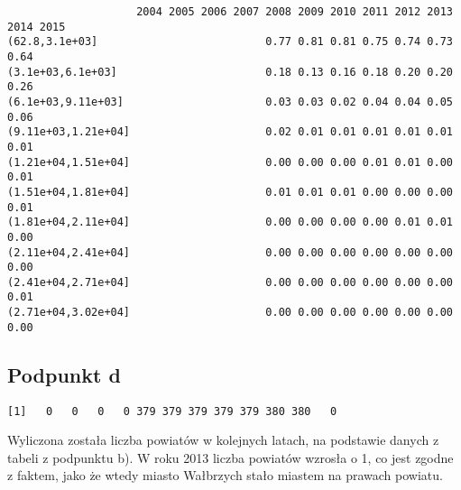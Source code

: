 \begin{verbatim}
                    2004 2005 2006 2007 2008 2009 2010 2011 2012 2013 2014 2015
(62.8,3.1e+03]                          0.77 0.81 0.81 0.75 0.74 0.73 0.64     
(3.1e+03,6.1e+03]                       0.18 0.13 0.16 0.18 0.20 0.20 0.26     
(6.1e+03,9.11e+03]                      0.03 0.03 0.02 0.04 0.04 0.05 0.06     
(9.11e+03,1.21e+04]                     0.02 0.01 0.01 0.01 0.01 0.01 0.01     
(1.21e+04,1.51e+04]                     0.00 0.00 0.00 0.01 0.01 0.00 0.01     
(1.51e+04,1.81e+04]                     0.01 0.01 0.01 0.00 0.00 0.00 0.01     
(1.81e+04,2.11e+04]                     0.00 0.00 0.00 0.00 0.01 0.01 0.00     
(2.11e+04,2.41e+04]                     0.00 0.00 0.00 0.00 0.00 0.00 0.00     
(2.41e+04,2.71e+04]                     0.00 0.00 0.00 0.00 0.00 0.00 0.01     
(2.71e+04,3.02e+04]                     0.00 0.00 0.00 0.00 0.00 0.00 0.00       
\end{verbatim}



\subsection*{Podpunkt d}

\begin{verbatim}
[1]   0   0   0   0 379 379 379 379 379 380 380   0
\end{verbatim}

Wyliczona została liczba powiatów w kolejnych latach, na podstawie danych z tabeli z podpunktu b).
W roku 2013 liczba powiatów wzrosła o 1, co jest zgodne z faktem,
jako że wtedy miasto Wałbrzych stało miastem na prawach powiatu.





